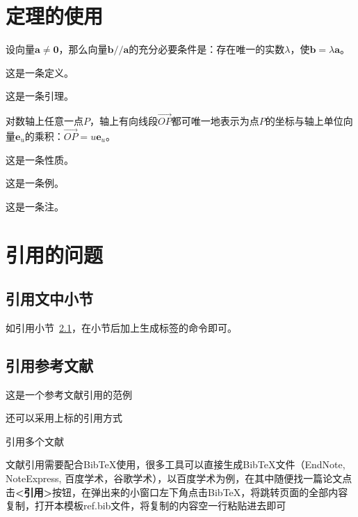 \section{定理的使用}
\begin{theorem}
  设向量$\boldsymbol a\neq\boldsymbol 0$，那么向量$\boldsymbol b//\boldsymbol a$的充分必要条件是：存在唯一的实数$\lambda$，使$\boldsymbol b=\lambda \boldsymbol a$。
\end{theorem}
\begin{definition}
  这是一条定义。
\end{definition}
\begin{lemma}
  这是一条引理。
\end{lemma}
\begin{corollary}
  对数轴上任意一点$P$，轴上有向线段$\overrightarrow {OP}$都可唯一地表示为点$P$的坐标与轴上单位向量$\boldsymbol e_u$的乘积：$\overrightarrow{OP}=u \boldsymbol e_u$。
\end{corollary}
\begin{proposition}
  这是一条性质。
\end{proposition}
\begin{example}
  这是一条例。
\end{example}
\begin{remark}
  这是一条注。
\end{remark}

\section{引用的问题}

\subsection{引用文中小节}\label{sec:ref}
如引用小节~\ref{sec:ref}，在小节后加上生成标签的命令即可。

\subsection{引用参考文献}
这是一个参考文献引用的范例\cite{r1}

还可以采用上标的引用方式

引用多个文献\cite{r1,r2,r3,r4,r5}

文献引用需要配合BibTeX使用，很多工具可以直接生成BibTeX文件（EndNote, NoteExpress, 百度学术，谷歌学术），以百度学术为例，在其中随便找一篇论文点击\textbf{<引用>}按钮，在弹出来的小窗口左下角点击BibTeX，将跳转页面的全部内容复制，打开本模板ref.bib文件，将复制的内容空一行粘贴进去即可

